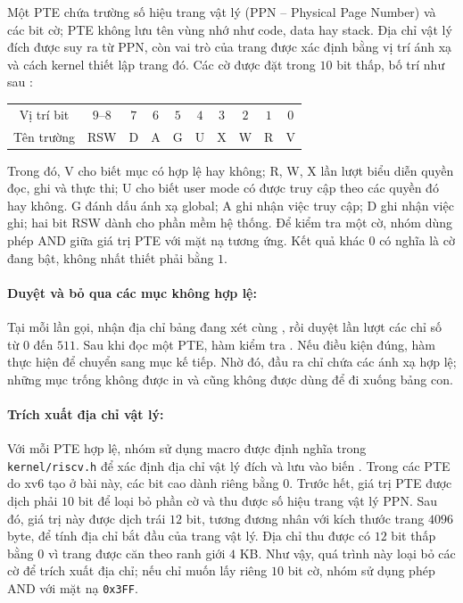 \documentclass[a4paper]{article}
\begin{document}
Một PTE chứa trường số hiệu trang vật lý (PPN -- Physical Page Number)
và các bit cờ; PTE không lưu tên vùng nhớ như code, data hay stack.
Địa chỉ vật lý đích được suy ra từ PPN, còn vai trò của trang được xác
định bằng vị trí ánh xạ và cách kernel thiết lập trang đó.
Các cờ được đặt trong $10$ bit thấp, bố trí như sau \cite{riscvspec}:

\begin{center}
\small
\begin{tabular}{c|ccccccccc}
\toprule
Vị trí bit & $9$--$8$ & $7$ & $6$ & $5$ & $4$ & $3$ & $2$ & $1$ & $0$\\
Tên trường & RSW & D & A & G & U & X & W & R & V\\
\bottomrule
\end{tabular}
\end{center}

Trong đó, V cho biết mục có hợp lệ hay không; R, W, X lần lượt biểu
diễn quyền đọc, ghi và thực thi; U cho biết user mode có được truy cập
theo các quyền đó hay không. G đánh dấu ánh xạ global; A ghi nhận việc
truy cập; D ghi nhận việc ghi; hai bit RSW dành cho phần mềm hệ thống.
Để kiểm tra một cờ, nhóm dùng phép AND giữa giá trị PTE với mặt nạ
tương ứng. Kết quả khác $0$ có nghĩa là cờ đang bật, không nhất thiết
phải bằng $1$.


\paragraph*{Duyệt và bỏ qua các mục không hợp lệ:}
Tại mỗi lần gọi,  nhận địa chỉ bảng đang xét cùng
, rồi duyệt lần lượt các chỉ số từ $0$ đến $511$.
Sau khi đọc một PTE, hàm kiểm tra .
Nếu điều kiện đúng, hàm thực hiện  để chuyển sang mục
kế tiếp. Nhờ đó, đầu ra chỉ chứa các ánh xạ hợp lệ; những mục trống
không được in và cũng không được dùng để đi xuống bảng con.

\paragraph*{Trích xuất địa chỉ vật lý:}
Với mỗi PTE hợp lệ, nhóm sử dụng macro  được định nghĩa
trong \texttt{kernel/riscv.h} để xác định địa chỉ vật lý đích và lưu
vào biến . Trong các PTE do xv6 tạo ở bài này, các bit cao
dành riêng bằng $0$. Trước hết, giá trị PTE được dịch phải $10$ bit
để loại bỏ phần cờ và thu được số hiệu trang vật lý PPN. Sau đó,
giá trị này được dịch trái $12$ bit, tương đương nhân với kích thước
trang $4096$ byte, để tính địa chỉ bắt đầu của trang vật lý. Địa chỉ
thu được có $12$ bit thấp bằng $0$ vì trang được căn theo ranh giới
$4$ KB. Như vậy, quá trình này loại bỏ các cờ để trích xuất địa chỉ;
nếu chỉ muốn lấy riêng $10$ bit cờ, nhóm sử dụng phép AND với mặt nạ
\texttt{0x3FF}.
\end{document}
